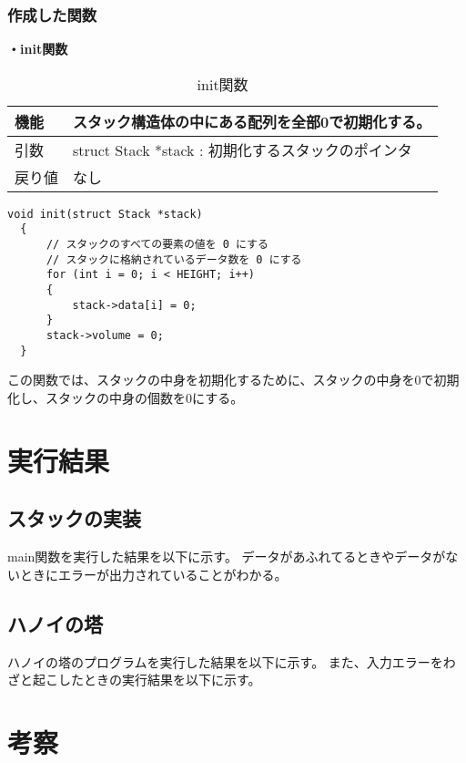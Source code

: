 \documentclass[dvipdfmx]{jsarticle}
\begin{document}
\subsubsection{作成した関数}

\textbf{・init関数}
\begin{table}[ht]
  \centering
  \caption{init関数}
  \begin{tabular}{|p{5cm}|p{10cm}|}
    \hline
    機能  & スタック構造体の中にある配列を全部0で初期化する。                  \\
    \hline
    引数  & struct Stack *stack : 初期化するスタックのポインタ       \\
    \hline
    戻り値 & なし                                         \\
    \hline
  \end{tabular}
  \label{tab:init_func}
\end{table}
\newpage
\begin{lstlisting}[caption={init関数}, label={lst:init_func}]
  void init(struct Stack *stack)
  {
      // スタックのすべての要素の値を 0 にする
      // スタックに格納されているデータ数を 0 にする
      for (int i = 0; i < HEIGHT; i++)
      {
          stack->data[i] = 0;
      }
      stack->volume = 0;
  }
\end{lstlisting}
この関数では、スタックの中身を初期化するために、スタックの中身を0で初期化し、スタックの中身の個数を0にする。
\section{実行結果}
\subsection{スタックの実装}
main関数を実行した結果を以下に示す。
% 
データがあふれてるときやデータがないときにエラーが出力されていることがわかる。
\subsection{ハノイの塔}
ハノイの塔のプログラムを実行した結果を以下に示す。
% 
また、入力エラーをわざと起こしたときの実行結果を以下に示す。\\

% 
\section{考察}
\end{document}
